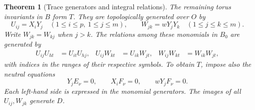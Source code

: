 \documentclass[a4paper,11pt]{article}
\newtheorem{theorem}[proposition]{Theorem}
\theoremstyle{definition}
\theoremstyle{remark}
\numberwithin{equation}{section}
\begin{document}
\begin{theorem}[Trace generators and integral relations]
\leavevmode\label{thm:allroottrace548}
The remaining torus invariants in \(B\) form \(T\). They are
topologically generated over \(O\) by
\[
 U_{ij}=X_iY_j\quad(1\le i\le p,\ 1\le j\le m),\qquad
 W_{jk}=wY_jY_k\quad(1\le j\le k\le m).
\]
Write \(W_{jk}=W_{kj}\) when \(j>k\). The relations among these
monomials in \(B_0\) are generated by
\[
\begin{aligned}
 U_{ij}U_{ht}&=U_{it}U_{hj},&
 U_{ij}W_{kt}&=U_{ik}W_{jt},&
 W_{ij}W_{kt}&=W_{ik}W_{jt},
\end{aligned}
\]
with indices in the ranges of their respective symbols. To obtain
\(T\), impose also the neutral equations
\[
       Y_j E_\nu=0,\qquad X_i F_\nu=0,\qquad wY_j F_\nu=0 .
\]
Each left-hand side is expressed in the monomial generators. The
images of all \(U_{ij},W_{jk}\) generate \(D\).
\end{theorem}
\end{document}
